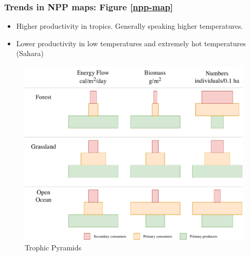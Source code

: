 \documentclass[12pt]{article}
\begin{document}
\subsubsection{Trends in NPP maps: Figure \ref{npp-map}}
\begin{itemize}
    \item Higher productivity in tropics. Generally speaking higher temperatures.
    \item Lower productivity in low temperatures and extremely hot temperatures (Sahara)
\end{itemize}

\begin{figure}[tph]
    \centering
    \includegraphics[width=5in]{energy-loss-trophic.pdf}
    \caption{Trophic Pyramids} \label{trophic-pyramids}
\end{figure}
\end{document}
